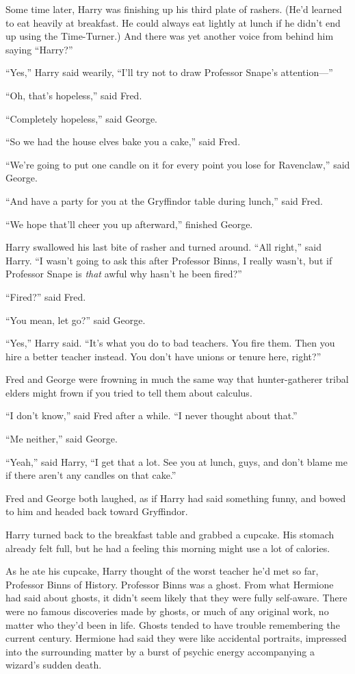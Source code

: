Some time later, Harry was finishing up his third plate of rashers.
(He'd learned to eat heavily at breakfast. He could always eat lightly
at lunch if he didn't end up using the Time-Turner.) And there was yet
another voice from behind him saying ``Harry?''

``Yes,'' Harry said wearily, ``I'll try not to draw Professor Snape's
attention---''

``Oh, that's hopeless,'' said Fred.

``Completely hopeless,'' said George.

``So we had the house elves bake you a cake,'' said Fred.

``We're going to put one candle on it for every point you lose for
Ravenclaw,'' said George.

``And have a party for you at the Gryffindor table during lunch,'' said
Fred.

``We hope that'll cheer you up afterward,'' finished George.

Harry swallowed his last bite of rasher and turned around. ``All
right,'' said Harry. ``I wasn't going to ask this after Professor Binns,
I really wasn't, but if Professor Snape is \emph{that} awful why hasn't
he been fired?''

``Fired?'' said Fred.

``You mean, let go?'' said George.

``Yes,'' Harry said. ``It's what you do to bad teachers. You fire them.
Then you hire a better teacher instead. You don't have unions or tenure
here, right?''

Fred and George were frowning in much the same way that hunter-gatherer
tribal elders might frown if you tried to tell them about calculus.

``I don't know,'' said Fred after a while. ``I never thought about
that.''

``Me neither,'' said George.

``Yeah,'' said Harry, ``I get that a lot. See you at lunch, guys, and
don't blame me if there aren't any candles on that cake.''

Fred and George both laughed, as if Harry had said something funny, and
bowed to him and headed back toward Gryffindor.

Harry turned back to the breakfast table and grabbed a cupcake. His
stomach already felt full, but he had a feeling this morning might use a
lot of calories.

As he ate his cupcake, Harry thought of the worst teacher he'd met so
far, Professor Binns of History. Professor Binns was a ghost. From what
Hermione had said about ghosts, it didn't seem likely that they were
fully self-aware. There were no famous discoveries made by ghosts, or
much of any original work, no matter who they'd been in life. Ghosts
tended to have trouble remembering the current century. Hermione had
said they were like accidental portraits, impressed into the surrounding
matter by a burst of psychic energy accompanying a wizard's sudden
death.

